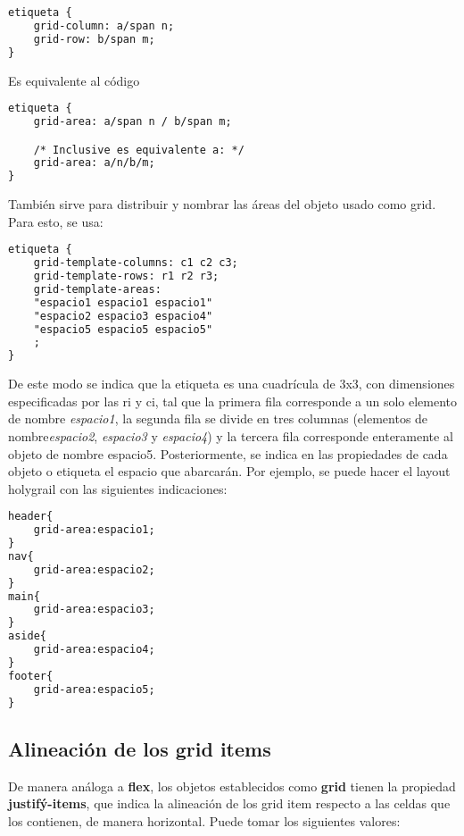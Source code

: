 \documentclass[10pt,oneside]{article}
\begin{document}
\begin{multicols}{2}
   \begin{lstlisting}[language=HTML]
etiqueta {
    grid-column: a/span n;
    grid-row: b/span m;
}       
   \end{lstlisting}

   Es equivalente al código
    
   \begin{lstlisting}[language=HTML]
etiqueta {
    grid-area: a/span n / b/span m;

    /* Inclusive es equivalente a: */
    grid-area: a/n/b/m;
}       
   \end{lstlisting}

   También sirve para distribuir y nombrar las áreas del objeto usado como grid. Para esto, se usa:
 
   \begin{lstlisting}[language=HTML]
etiqueta {
    grid-template-columns: c1 c2 c3;
    grid-template-rows: r1 r2 r3;
    grid-template-areas:
    "espacio1 espacio1 espacio1"
    "espacio2 espacio3 espacio4"
    "espacio5 espacio5 espacio5"
    ;
}       
   \end{lstlisting}

    De este modo se indica que la etiqueta es una cuadrícula de 3x3, con dimensiones especificadas por las ri y ci, tal que la primera fila corresponde a un solo elemento de nombre \textit{espacio1}, la segunda fila se divide en tres columnas (elementos de nombre\textit{espacio2}, \textit{espacio3} y \textit{espacio4}) y la tercera fila corresponde enteramente al objeto de nombre espacio5. Posteriormente, se indica en las propiedades de cada objeto o etiqueta el espacio que abarcarán. Por ejemplo, se puede hacer el layout holygrail con las siguientes indicaciones:

    \begin{lstlisting}[language=HTML]
header{
    grid-area:espacio1;
}
nav{
    grid-area:espacio2;
}
main{
    grid-area:espacio3;
}
aside{
    grid-area:espacio4;
}
footer{
    grid-area:espacio5;
}

    \end{lstlisting}

\subsection{Alineación de los grid items}

    De manera análoga a \textbf{flex}, los objetos establecidos como \textbf{grid} tienen la propiedad \textbf{justifý-items}, que indica la alineación de los grid item respecto a las celdas que los contienen, de manera horizontal. Puede tomar los siguientes valores:


\end{multicols}
\end{document}
